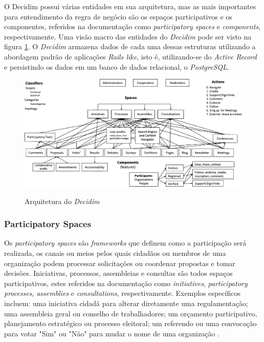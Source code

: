 O Decidim possui várias entidades em sua arquitetura, mas as mais importantes para entendimento da regra de negócio são os espaços participativos e os componentes, referidos na documentação como \textit{participatory spaces} e \textit{components}, respectivamente. Uma visão macro das entidades do \textit{Decidim} pode ser visto na figura \ref{fig:arquitetura-decidim}. O \textit{Decidim} armazena dados de cada uma dessas estruturas utilizando a abordagem padrão de aplicações \textit{Rails like}, isto é, utilizando-se do \textit{Active Record} e persistindo os dados em um banco de dados relacional, o \textit{PostgreSQL}.

\begin{figure}[htbp]
  \centering
  \caption{Arquitetura do \textit{Decidim}}
  \includegraphics[width=\textwidth]{figuras/diagrama_decidim-min.eps}
  \label{fig:arquitetura-decidim}
\end{figure}

\subsubsection{Participatory Spaces}

Os \textit{participatory spaces} são \textit{frameworks} que definem como a participação será realizada, os canais ou meios pelos quais cidadãos ou membros de uma organização podem processar solicitações ou coordenar propostas e tomar decisões. Iniciativas, processos, assembleias e consultas são todos espaços participativos, estes referidos na documentação como \textit{initiatives}, \textit{participatory processes}, \textit{assemblies} e \textit{consultations}, respectivamente. Exemplos específicos incluem: uma iniciativa cidadã para alterar diretamente uma regulamentação; uma assembleia geral ou conselho de trabalhadores; um orçamento participativo, planejamento estratégico ou processo eleitoral; um referendo ou uma convocação para votar "Sim" ou "Não" para mudar o nome de uma organização \cite{decidim-descriptionpage}.

